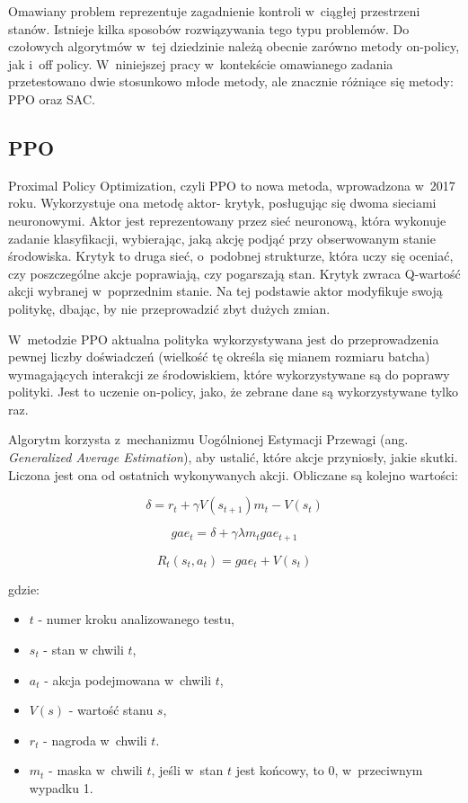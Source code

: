 \documentclass[a4paper,12pt]{article}
\begin{document}
Omawiany problem reprezentuje zagadnienie kontroli w~ciągłej przestrzeni stanów. Istnieje kilka sposobów rozwiązywania tego typu problemów. Do czołowych algorytmów w~tej dziedzinie należą obecnie zarówno metody on-policy, jak i~off policy. W~niniejszej pracy w~kontekście omawianego zadania przetestowano dwie stosunkowo młode metody, ale znacznie różniące się metody: PPO oraz SAC.


\subsection{PPO}
Proximal Policy Optimization, czyli PPO to nowa metoda, wprowadzona w~2017 roku. Wykorzystuje ona metodę aktor- krytyk, posługując się dwoma sieciami neuronowymi. Aktor jest reprezentowany przez sieć neuronową, która wykonuje zadanie klasyfikacji, wybierając, jaką akcję podjąć przy obserwowanym stanie środowiska. Krytyk to druga sieć, o~podobnej strukturze, która uczy się oceniać, czy poszczególne akcje poprawiają, czy pogarszają stan. Krytyk zwraca Q-wartość akcji wybranej w~poprzednim stanie. Na tej podstawie aktor modyfikuje swoją politykę, dbając, by nie przeprowadzić zbyt dużych zmian.

W~metodzie PPO aktualna polityka wykorzystywana jest do przeprowadzenia pewnej liczby doświadczeń (wielkość tę określa się mianem rozmiaru batcha) wymagających interakcji ze środowiskiem, które wykorzystywane są do poprawy polityki. Jest to uczenie on-policy, jako, że zebrane dane są wykorzystywane tylko raz.

Algorytm korzysta z~mechanizmu Uogólnionej Estymacji Przewagi (ang. \textit{Generalized Average Estimation}), aby ustalić, które akcje przyniosły, jakie skutki. Liczona jest ona od ostatnich wykonywanych akcji. Obliczane są kolejno wartości:

\begin{equation}
	\delta = r_t + \gamma V(s_{t+1})m_t - V(s_t)
\end{equation}

\begin{equation}
	gae_t = \delta + \gamma \lambda m_t gae_{t+1}
\end{equation}

\begin{equation}
	R_t(s_t,a_t) = gae_t + V(s_t)
\end{equation}

gdzie:
\begin{itemize}
	\item $t$ - numer kroku analizowanego testu,
	\item $s_t$ - stan w chwili $t$,
	\item $a_t$ - akcja podejmowana w~chwili $t$,
	\item $V(s)$ - wartość stanu $s$,
	\item $r_t$ - nagroda w~chwili $t$.
	\item $m_t$ - maska w~chwili $t$, jeśli w~stan $t$ jest końcowy, to 0, w~przeciwnym wypadku 1.
\end{itemize}
\end{document}
